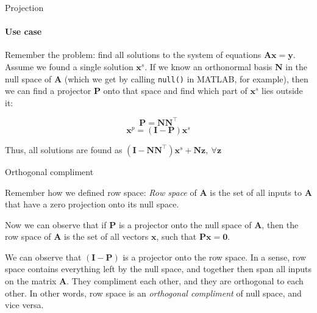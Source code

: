 \documentclass{beamer}
\begin{document}
\begin{frame}{Projection}
\framesubtitle{Use case}
\begin{flushleft}

Remember the problem: find all solutions to the system of equations $\mathbf{A} \mathbf{x} = \mathbf{y}$. Assume we found a single solution $\mathbf{x}^s$. If we know an orthonormal basis $\mathbf{N}$ in the null space of $\mathbf{A}$ (which we get by calling \texttt{null()} in MATLAB, for example), then we can find a projector $\mathbf{P}$ onto that space and find which part of $\mathbf{x}^s$ lies outside it:

\begin{equation}
\mathbf{P} = \mathbf{N} \mathbf{N}^\top
\end{equation}
\begin{equation}
\mathbf{x}^p = (\mathbf{I} - \mathbf{P}) \mathbf{x}^s
\end{equation}

Thus, all solutions are found as $(\mathbf{I} - \mathbf{N} \mathbf{N}^\top) \mathbf{x}^s + \mathbf{N}\mathbf{z}, \ \forall \mathbf{z}$

\end{flushleft}
\end{frame}



\begin{frame}{Orthogonal compliment}
\begin{flushleft}

Remember how we defined row space: \emph{Row space} of $\mathbf{A}$ is the set of all inputs to $\mathbf{A}$ that have a zero projection onto its null space.

\bigskip

Now we can observe that if $\mathbf{P}$ is a projector onto the null space of $\mathbf{A}$, then the row space of $\mathbf{A}$ is the set of all vectors $\mathbf{x}$, such that $\mathbf{P}\mathbf{x} = \mathbf{0}$. 

\bigskip

We can observe that $(\mathbf{I} - \mathbf{P})$ is a projector onto the row space. In a sense, row space contains everything left by the null space, and together then span all inputs on the matrix $\mathbf{A}$. They compliment each other, and they are orthogonal to each other. In other words, row space is an \emph{orthogonal compliment} of null space, and vice versa. 

\end{flushleft}
\end{frame}
\end{document}
